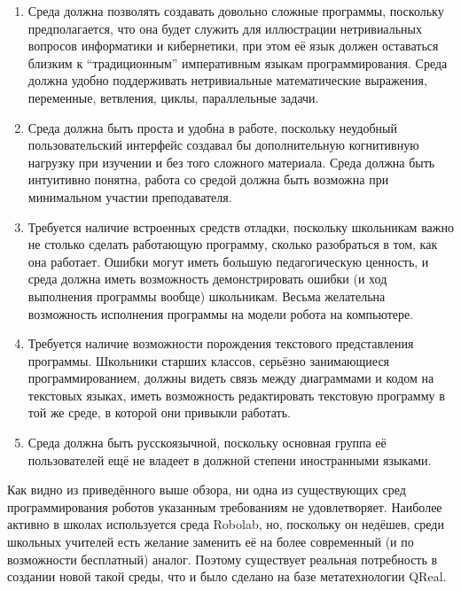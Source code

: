 \begin{enumerate}
	\item Среда должна позволять создавать довольно сложные программы, поскольку предполагается, 
		что она будет служить для иллюстрации нетривиальных вопросов информатики и кибернетики, 
		при этом её язык должен оставаться близким к "`традиционным"' императивным языкам 
		программирования. Среда должна удобно поддерживать нетривиальные математические 
		выражения, переменные, ветвления, циклы, параллельные задачи.
	\item Среда должна быть проста и удобна в работе, поскольку неудобный пользовательский 
		интерфейс создавал бы дополнительную когнитивную нагрузку при изучении и без того 
		сложного материала. Среда должна быть интуитивно понятна, работа со средой должна 
		быть возможна при минимальном участии преподавателя.
	\item Требуется наличие встроенных средств отладки, поскольку школьникам важно не 
		столько сделать работающую программу, сколько разобраться в том, как она работает. 
		Ошибки могут иметь большую педагогическую ценность, и среда должна иметь возможность 
		демонстрировать ошибки (и ход выполнения программы вообще) школьникам. Весьма желательна 
		возможность исполнения программы на модели робота на компьютере.
	\item Требуется наличие возможности порождения текстового представления программы. 
		Школьники старших классов, серьёзно занимающиеся программированием, должны видеть 
		связь между диаграммами и кодом на текстовых языках, иметь возможность редактировать 
		текстовую программу в той же среде, в которой они привыкли работать.
	\item Среда должна быть русскоязычной, поскольку основная группа её пользователей 
		ещё не владеет в должной степени иностранными языками.
\end{enumerate}

Как видно из приведённого выше обзора, ни одна из существующих сред программирования 
роботов указанным требованиям не удовлетворяет. Наиболее активно в школах используется 
среда Robolab, но, поскольку он недёшев, среди школьных учителей есть желание заменить 
её на более современный (и по возможности бесплатный) аналог. Поэтому существует реальная 
потребность в создании новой такой среды, что и было сделано на базе метатехнологии QReal.


